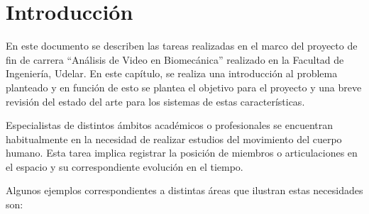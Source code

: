 \section{Introducción}

En este documento se describen las tareas realizadas en el marco del proyecto de fin de carrera ``Análisis de Video en Biomecánica'' realizado en la Facultad de Ingeniería, Udelar. En este capítulo, se realiza una introducción al problema planteado y en función de esto se plantea el objetivo para el proyecto y una breve revisión del estado del arte para los sistemas de estas características.

\vspace{5 mm}

Especialistas de distintos ámbitos académicos o profesionales se encuentran habitualmente en la necesidad de realizar estudios del movimiento del cuerpo humano. Esta tarea implica registrar la posición de miembros o articulaciones en el espacio y su correspondiente evolución en el tiempo.

Algunos ejemplos correspondientes a distintas áreas que ilustran estas necesidades son:

